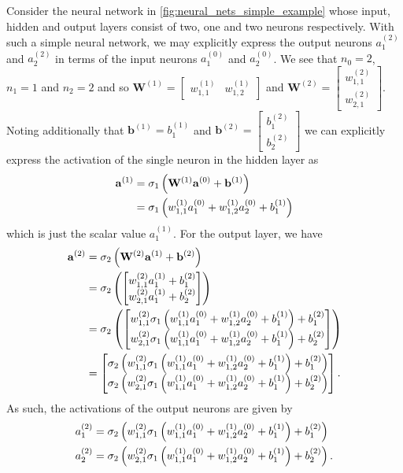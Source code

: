 \documentclass[11pt]{article}
\begin{document}
Consider the neural network in \autoref{fig:neural_nets_simple_example} whose input, hidden and output layers consist of two, one and two neurons respectively. With such a simple neural network, we may explicitly express the output neurons $a_1^{(2)}$ and $a_2^{(2)}$ in terms of the input neurons $a_1^{(0)}$ and $a_2^{(0)}$. We see that $n_0=2$, $n_1=1$ and $n_2=2$ and so
$\mathbf{W}^{(1)}=
\begin{bmatrix}
    w_{1,1}^{(1)} & w_{1,2}^{(1)}
\end{bmatrix}
$
and
$\mathbf{W}^{(2)}=
\begin{bmatrix}
    w_{1,1}^{(2)}\\
    w_{2,1}^{(2)}
\end{bmatrix}.
$
Noting additionally that $\mathbf{b}^{(1)}=b_1^{(1)}$ and
$\mathbf{b}^{(2)}=
\begin{bmatrix}
    b_{1}^{(2)}\\
    b_{2}^{(2)}
\end{bmatrix}$
we can explicitly express the activation of the single neuron in the hidden layer as
\begin{align*}
\mathbf{a}^{(1)}
&=
\sigma_1\left(\mathbf{W}^{(1)}\mathbf{a}^{(0)}+\mathbf{b}^{(1)}\right)\\
&=
\sigma_1\left(w_{1,1}^{(1)}a_1^{(0)}+w_{1,2}^{(1)}a_2^{(0)}+b_1^{(1)}\right)
\end{align*}
which is just the scalar value $a_1^{(1)}$. For the output layer, we have
\begin{align*}
\mathbf{a}^{(2)}
&=
\sigma_2\left(\mathbf{W}^{(2)}\mathbf{a}^{(1)}+\mathbf{b}^{(2)}\right)\\
&=
\sigma_2\left(
\begin{bmatrix}
    w_{1,1}^{(2)}a_1^{(1)} + b_1^{(2)}\\
    w_{2,1}^{(2)}a_1^{(1)} + b_2^{(2)}
\end{bmatrix}
\right)\\
&=
\sigma_2\left(
\begin{bmatrix}
    w_{1,1}^{(2)}\sigma_1\left(w_{1,1}^{(1)}a_1^{(0)}+w_{1,2}^{(1)}a_2^{(0)}+b_1^{(1)}\right) + b_1^{(2)}\\
    w_{2,1}^{(2)}\sigma_1\left(w_{1,1}^{(1)}a_1^{(0)}+w_{1,2}^{(1)}a_2^{(0)}+b_1^{(1)}\right) + b_2^{(2)}
\end{bmatrix}
\right)\\
&=
\begin{bmatrix}
    \sigma_2\left(w_{1,1}^{(2)}\sigma_1\left(w_{1,1}^{(1)}a_1^{(0)}+w_{1,2}^{(1)}a_2^{(0)}+b_1^{(1)}\right) + b_1^{(2)}\right)\\
    \sigma_2\left(w_{2,1}^{(2)}\sigma_1\left(w_{1,1}^{(1)}a_1^{(0)}+w_{1,2}^{(1)}a_2^{(0)}+b_1^{(1)}\right) + b_2^{(2)}\right)
\end{bmatrix}.
\end{align*}
As such, the activations of the output neurons are given by
\begin{align*}
    a_1^{(2)}&=\sigma_2\left(w_{1,1}^{(2)}\sigma_1\left(w_{1,1}^{(1)}a_1^{(0)}+w_{1,2}^{(1)}a_2^{(0)}+b_1^{(1)}\right) + b_1^{(2)}\right)\\
    a_2^{(2)}&=\sigma_2\left(w_{2,1}^{(2)}\sigma_1\left(w_{1,1}^{(1)}a_1^{(0)}+w_{1,2}^{(1)}a_2^{(0)}+b_1^{(1)}\right) + b_2^{(2)}\right).
\end{align*}
\end{document}
